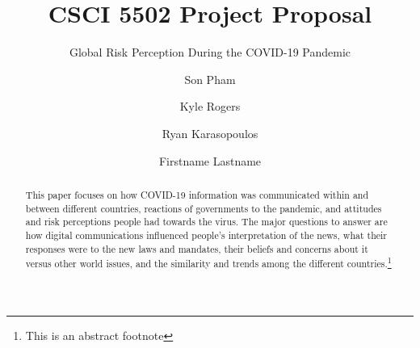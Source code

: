 \documentclass[11pt,sigconf]{acmart}
\begin{document}
\title{CSCI 5502 Project Proposal}
\subtitle{Global Risk Perception During the COVID-19 Pandemic}

\author{Son Pham}

\author{Kyle Rogers}

\author{Ryan Karasopoulos}

\author{Firstname Lastname}


\renewcommand{\shortauthors}{S. Pham, K. Rogers, Reiko, and Ryan}


\begin{abstract}
This paper focuses on how COVID-19 information was communicated within and between different countries, reactions of governments to the pandemic, and attitudes and risk perceptions people had towards the virus. The major questions to answer are how digital communications influenced people’s interpretation of the news, what their responses were to the new laws and mandates, their beliefs and concerns about it versus other world issues, and the similarity and trends among the different countries.\footnote{This is an abstract footnote}
\end{abstract}
\end{document}

